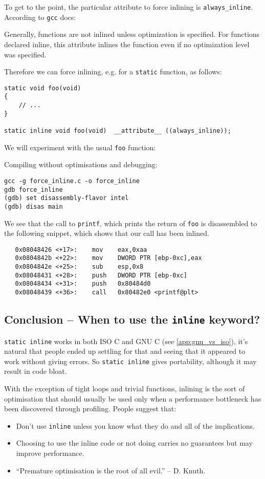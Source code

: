 To get to the point, the particular attribute to force inlining is \texttt{always\_inline}. According to \texttt{gcc} docs:
\begin{myquote}
Generally, functions are not inlined unless optimization is specified. For functions declared inline, this attribute inlines the function even if no optimization level was specified.
\end{myquote}
Therefore we can force inlining, e.g. for a \texttt{static} function, as follows:
\begin{verbatim}
static void foo(void)
{
    // ...
}

static inline void foo(void)  __attribute__ ((always_inline));
\end{verbatim}
We will experiment with the usual \texttt{foo} function:

Compiling without optimisations and debugging:
\begin{lstlisting}[style=terminal]
gcc -g force_inline.c -o force_inline
gdb force_inline
(gdb) set disassembly-flavor intel
(gdb) disas main
\end{lstlisting}
We see that the call to \texttt{printf}, which prints the return of \texttt{foo} is disassembled to the following snippet, which shows that our call has been inlined.
\begin{verbatim}
   0x08048426 <+17>:	mov    eax,0xaa
   0x0804842b <+22>:	mov    DWORD PTR [ebp-0xc],eax
   0x0804842e <+25>:	sub    esp,0x8
   0x08048431 <+28>:	push   DWORD PTR [ebp-0xc]
   0x08048434 <+31>:	push   0x80484d0
   0x08048439 <+36>:	call   0x80482e0 <printf@plt>
\end{verbatim}


\subsection{Conclusion -- When to use the \texttt{inline} keyword?}

\texttt{static inline} works in both ISO C and GNU C (see \ref{app:gnu_vs_iso}), it's natural that people ended up settling for that and seeing that it appeared to work without giving errors. So \texttt{static inline} gives portability, although it may result in code bloat.

With the exception of tight loops and trivial functions, inlining is the sort of optimisation that should usually be used only when a performance bottleneck has been discovered through profiling. People suggest that:

\begin{itemize}
    \item Don't use \texttt{inline} unless you know what they do and all of the
implications.
    \item Choosing to use the inline code or not doing carries no guarantees
but may improve performance.
    \item  ``Premature optimisation is the root of all evil.'' -- D. Knuth.
\end{itemize}


